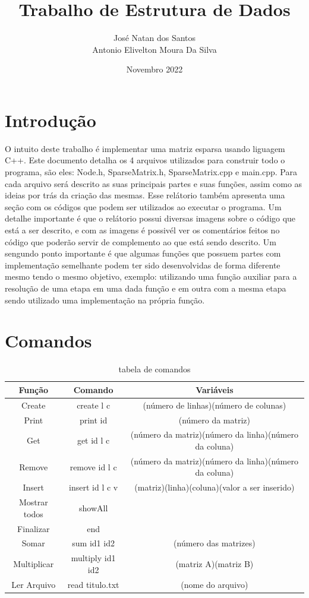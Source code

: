 \documentclass[a4paper,12pt]{article}
\title{Trabalho de Estrutura de Dados}
\author{ José Natan dos Santos \\Antonio Elivelton Moura Da Silva }
\date{Novembro 2022}
\begin{document}
\maketitle

\section{Introdução}
O intuito deste trabalho é implementar uma matriz esparsa usando liguagem C++. Este documento detalha os 4 arquivos utilizados para construir todo o programa, são eles: Node.h, SparseMatrix.h, SparseMatrix.cpp e main.cpp.
Para cada arquivo será descrito as suas principais partes e suas funções, assim como as ideias por trás da criação das mesmas.
Esse relátorio também apresenta uma seção com os códigos que podem ser utilizados ao executar o programa.
Um detalhe importante é que o relátorio possui diversas imagens sobre o código que está a ser descrito, e com as imagens é possivél ver os comentários feitos no código que poderão servir de complemento ao que está sendo descrito.
Um sengundo ponto importante é que algumas funções que possuem partes com implementação semelhante podem ter sido desenvolvidas de forma diferente mesmo tendo o mesmo objetivo, exemplo: utilizando uma função auxiliar para a resolução de uma etapa em uma dada função e em outra com a mesma etapa sendo utilizado uma implementação na própria função. 

\section{Comandos}
\begin{table}[H]
\begin{center}
\begin{tabular}{ |c|c|c| } 
    \hline
    Função & Comando & Variáveis \\ 
    \hline
    \hline
    Create & create l c & (número de linhas)(número de colunas) \\ 
    \hline
    Print & print id & (número da matriz) \\
    \hline
    Get & get id l c & (número da matriz)(número da linha)(número da coluna)\\
    \hline
    Remove & remove id l c & (número da matriz)(número da linha)(número da coluna)\\
    \hline
    Insert & insert id l c v & (matriz)(linha)(coluna)(valor a ser inserido)\\
    \hline 
    Mostrar todos & showAll & \\
    \hline
    Finalizar & end & \\
    \hline
    Somar & sum id1 id2 & (número das matrizes)\\
    \hline
    Multiplicar & multiply id1 id2 & (matriz A)(matriz B)\\
    \hline
    Ler Arquivo & read titulo.txt & (nome do arquivo)\\
    \hline
\end{tabular}
\caption{\label{tab:comandos} tabela de comandos}
\end{center}
\end{table}
\end{document}
